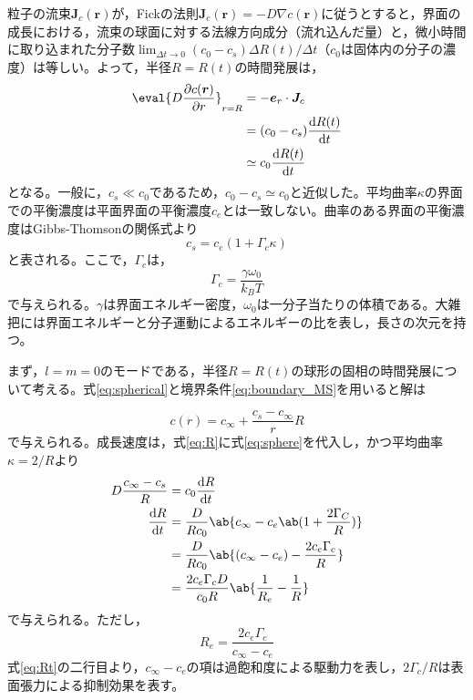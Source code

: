 \documentclass[autodetect-engine,dvi=dvipdfmx,a4paper,ja=standard,oneside,openany]{bxjsbook}
\begin{document}
粒子の流束$\bm{J}_c(\bm{r})$が，Fickの法則$\bm{J}_c(\bm{r})=-D\nabla c(\bm{r})$に従うとすると，界面の成長における，流束の球面に対する法線方向成分（流れ込んだ量）と，微小時間に取り込まれた分子数$\lim_{\Delta t\to 0} (c_0-c_s)\Delta R(t)/\Delta t$（$c_0$は固体内の分子の濃度）は等しい。よって，半径$R=R(t)$の時間発展は，
\begin{equation}
  \begin{split}
    \eval{D\pdv{c(\bm{r})}{r}}_{r=R} & = -\bm{e}_r\cdot\bm{J}_c \\
                                     & = (c_0-c_s)\odv{R(t)}{t} \\
                                     & \simeq c_0\odv{R(t)}{t}
  \end{split}
  \label{eq:R}
\end{equation}
となる。一般に，$c_s\ll c_0$であるため，$c_0-c_s\simeq c_0$と近似した。平均曲率$\kappa$の界面での平衡濃度は平面界面の平衡濃度$c_e$とは一致しない。曲率のある界面の平衡濃度はGibbs-Thomsonの関係式より
\begin{equation}
  c_s = c_e(1+\Gamma_c \kappa)
  \label{eq:Gibbs-Thomson}
\end{equation}
と表される。ここで，$\Gamma_c$は，
\begin{equation}
  \Gamma_c = \frac{\gamma \omega_0}{k_BT}
\end{equation}
で与えられる。$\gamma$は界面エネルギー密度，$\omega_0$は一分子当たりの体積である。大雑把には界面エネルギーと分子運動によるエネルギーの比を表し，長さの次元を持つ。

まず，$l=m=0$のモードである，半径$R=R(t)$の球形の固相の時間発展について考える。式\eqref{eq:spherical}と境界条件\eqref{eq:boundary_MS}を用いると解は

\begin{equation}
  c(r) = c_{\infty} + \frac{c_s-c_{\infty}}{r}R
  \label{eq:sphere}
\end{equation}
で与えられる。成長速度は，式\eqref{eq:R}に式\eqref{eq:sphere}を代入し，かつ平均曲率$\kappa=2/R$より
\begin{equation}
  \begin{split}
    D\frac{c_\infty-c_s}{R} & =c_0\odv{R}{t}                                                 \\
    \odv{R}{t}              & = \frac{D}{Rc_0}\ab\{c_\infty-c_e\ab(1+\frac{2\Gamma_C}{R})\}  \\
                            & = \frac{D}{R c_0}\ab\{(c_\infty-c_e)-\frac{2c_e\Gamma_c}{R}\}  \\
                            & = \frac{2c_e\Gamma_c D}{c_0 R}\ab\{\frac{1}{R_e}-\frac{1}{R}\}
  \end{split}
  \label{eq:Rt}
\end{equation}
で与えられる。ただし，
\begin{equation}
  R_e = \frac{2c_e \Gamma_c }{c_\infty-c_e}
  \label{eq:Re}
\end{equation}
式\eqref{eq:Rt}の二行目より，$c_\infty-c_e$の項は過飽和度による駆動力を表し，$2\Gamma_c/R$は表面張力による抑制効果を表す。
\end{document}
